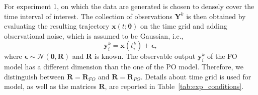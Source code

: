 For experiment 1,  on which the data are generated is chosen to densely cover the time interval of interest.
The collection of observations $\mathbf{Y}^k$ is then obtained by evaluating the resulting trajectory $\mathbf{x}(t;\boldsymbol{\theta})$ on the time grid and adding observational noise, which is assumed to be Gaussian, i.e.,
 \begin{equation}\label{eq:output_scalar}
    \mathbf{y}_{i}^{k} = \mathbf{x}(t_{i}^{k}) + \boldsymbol{\epsilon},
\end{equation}
where $\boldsymbol{\epsilon} \sim \mathcal{N}(\mathbf{0}, \mathbf{R})$ and $\mathbf{R}$ is known.
The observable output $\mathbf{y}_{i}^{k}$ of the FO model has a different dimension than the one of the PO model.
Therefore, we distinguish between $\mathbf{R}=\mathbf{R}_{FO}$ and $\mathbf{R}=\mathbf{R}_{PO}$.
Details about  time grid is used for  model, as well as the matrices $\mathbf{R}$, are reported in Table~\ref{tab:exp_conditions}.

